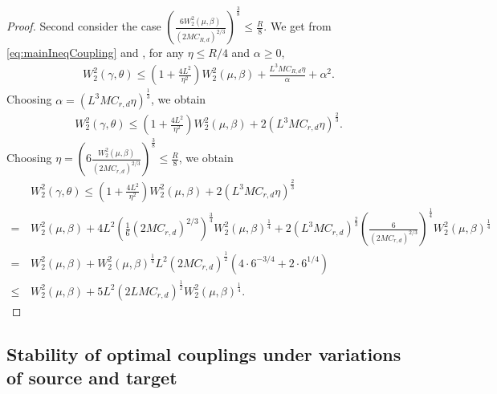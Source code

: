 \documentclass[11pt]{article}
\newcommand{\1}{\mathbbm{1}}
\numberwithin{equation}{section}
\begin{document}
\begin{proof}
	Second consider the case $\left(\frac{6W_2^2(\mu,\beta)}{(2MC_{R,d})^{2/3}}\right)^{\frac{3}{8}} \leq \frac{R}{8}$.
	We get from \eqref{eq:mainIneqCoupling} and , for any $\eta \leq R/4$ and $\alpha \geq 0$,
	\begin{align*}
		W_2^2(\gamma, \theta) \leq \left(1 + \frac{4L^2}{\eta^2}\right)W_2^2(\mu,\beta) + \frac{L^3M C_{R,d}\eta}{\alpha} + \alpha^2.
	\end{align*}
	Choosing $\alpha = (L^3MC_{r,d}\eta)^{\frac{1}{3}}$, we obtain
	\begin{align*}
		W_2^2(\gamma, \theta) \leq \left(1 + \frac{4L^2}{\eta^2}\right)W_2^2(\mu,\beta) + 2(L^3MC_{r,d}\eta)^{\frac{2}{3}}. 
	\end{align*}
	Choosing $\eta = \left(6\frac{W_2^2(\mu,\beta)}{(2MC_{r,d})^{2/3}}\right)^{\frac{3}{8}} \leq \frac{R}{8}$, we obtain 
	\begin{align*}
		&W_2^2(\gamma, \theta) \leq \left(1 + \frac{4L^2}{\eta^2}\right)W_2^2(\mu,\beta) + 2(L^3MC_{r,d}\eta)^{\frac{2}{3}} \\
		=\,&W_2^2(\mu,\beta) + 4L^2\left(\frac{1}{6}(2MC_{r,d})^{2/3}\right)^{\frac{3}{4}} W_2^2(\mu,\beta)^{\frac{1}{4}} + 2(L^3MC_{r,d})^{\frac{2}{3}}  \left(\frac{6}{(2MC_{r,d})^{2/3}}\right)^{\frac{1}{4}} W_2^2(\mu,\beta)^{\frac{1}{4}} \\
        =\,& W_2^2(\mu,\beta) + W_2^2(\mu,\beta)^{\frac{1}{4}} L^2(2MC_{r,d})^{\frac{1}{2}} \left(4\cdot 6^{-3/4} + 2 \cdot 6^{1/4}\right)\\
		\leq\,& W_2^2(\mu,\beta) +  5 L^2 (2LMC_{r,d})^{\frac{1}{2}}  W_2^2(\mu,\beta)^{\frac{1}{4}} .
	\end{align*}
\end{proof}

\subsection{Stability of optimal couplings under variations of source and target}
\end{document}
